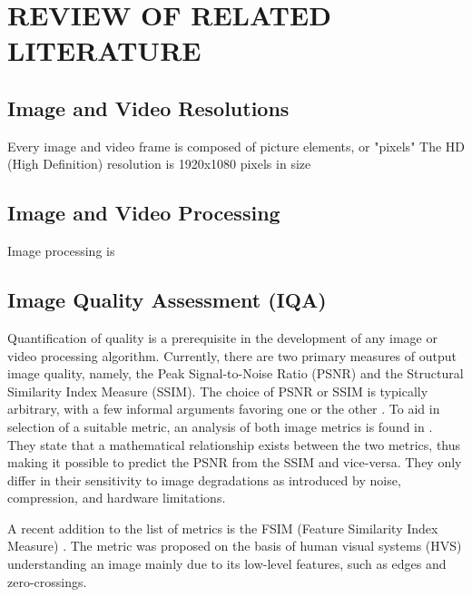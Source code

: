 
\chapter{REVIEW OF RELATED LITERATURE} %

\label{Chapter2} %


\section{Image and Video Resolutions}
Every image and video frame is composed of picture elements, or "pixels"
The HD (High Definition) resolution is 1920x1080 pixels in size

\section{Image and Video Processing}
Image processing is

\section{Image Quality Assessment (IQA)}
Quantification of quality is a prerequisite in the development of any image or video processing algorithm.
Currently, there are two primary measures of output image quality, namely, the Peak Signal-to-Noise Ratio (PSNR) and the Structural Similarity Index Measure (SSIM). 
The choice of PSNR or SSIM is typically arbitrary, with a few informal arguments favoring one or the other \citep{Farsiu2004}.
To aid in selection of a suitable metric, an analysis of both image metrics is found in \cite{Hore2010}. 
They state that a mathematical relationship exists between the two metrics, thus making it possible to predict the PSNR from the SSIM and vice-versa. 
They only differ in their sensitivity to image degradations as introduced by noise, compression, and hardware limitations.

A recent addition to the list of metrics is the FSIM (Feature Similarity Index Measure) \citep{Zhang2011a}.
The metric was proposed on the basis of human visual systems (HVS) understanding an image mainly due to its low-level features, such as edges and zero-crossings.


